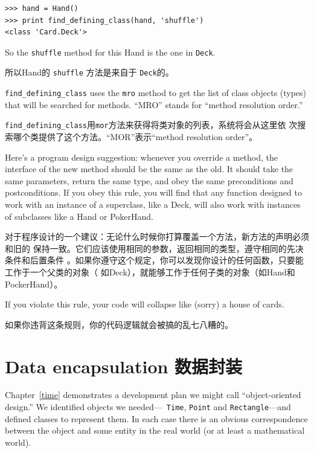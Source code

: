 \documentclass[10pt]{book}
\begin{document}
\begin{CJK}{UTF8}{gbsn}
\begin{verbatim}
>>> hand = Hand()
>>> print find_defining_class(hand, 'shuffle')
<class 'Card.Deck'>
\end{verbatim}
%
So the {\tt shuffle} method for this Hand is the one in {\tt Deck}.

所以Hand的 {\tt shuffle} 方法是来自于 {\tt Deck}的。

\verb"find_defining_class" uses the {\tt mro} method to get the list
of class objects (types) that will be searched for methods.  ``MRO''
stands for ``method resolution order.''

\verb"find_defining_class"用{\tt mor}方法来获得将类对象的列表，系统将会从这里依
次搜索哪个类提供了这个方法。``MOR''表示``method resolution order''。

Here's a program design suggestion: whenever you override a method,
the interface of the new method should be the same as the old.  It
should take the same parameters, return the same type, and obey the
same preconditions and postconditions.  If you obey this rule, you
will find that any function designed to work with an instance of a
superclass, like a Deck, will also work with instances of subclasses
like a Hand or PokerHand.

对于程序设计的一个建议：无论什么时候你打算覆盖一个方法，新方法的声明必须和旧的
保持一致。它们应该使用相同的参数，返回相同的类型，遵守相同的先决条件和后置条件
。如果你遵守这个规定，你可以发现你设计的任何函数，只要能工作于一个父类的对象（
如Deck），就能够工作于任何子类的对象（如Hand和PockerHand）。

If you violate this rule, your code will collapse like (sorry)
a house of cards.

如果你违背这条规则，你的代码逻辑就会被搞的乱七八糟的。


\section{Data encapsulation 数据封装}

Chapter~\ref{time} demonstrates a development plan we might call
``object-oriented design.''  We identified objects we needed---{\tt
  Time}, {\tt Point} and {\tt Rectangle}---and defined classes to
represent them.  In each case there is an obvious correspondence
between the object and some entity in the real world (or at least a
mathematical world).


\end{CJK}
\end{document}
